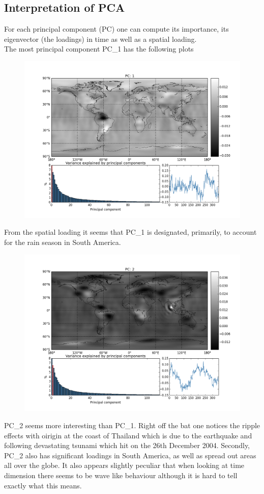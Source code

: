 \subsection{Interpretation of PCA}

For each principal component (PC) one can compute its importance, its eigenvector (the loadings) in time as well as a spatial loading. 
\\
The most principal component PC\_1 has the following plots

\begin{figure}[H]
\centering
\includegraphics[width=1.0\linewidth]{figures/pc_1.png}
\end{figure}
From the spatial loading it seems that PC\_1 is designated, primarily, to account for the rain season in South America. 

\begin{figure}[H]
\centering
\includegraphics[width=1.0\linewidth]{figures/pc_2.png}
\end{figure}
PC\_2 seems more interesting than PC\_1. Right off the bat one notices the ripple effects with oirigin at the coast of Thailand which is due to the earthquake and following devastating tsunami which hit on the 26th December 2004. Secondly, PC\_2 also has significant loadings in South America, as well as spread out areas all over the globe. It also appears slightly peculiar that when looking at time dimension there seems to be wave like behaviour although it is hard to tell exactly what this means.